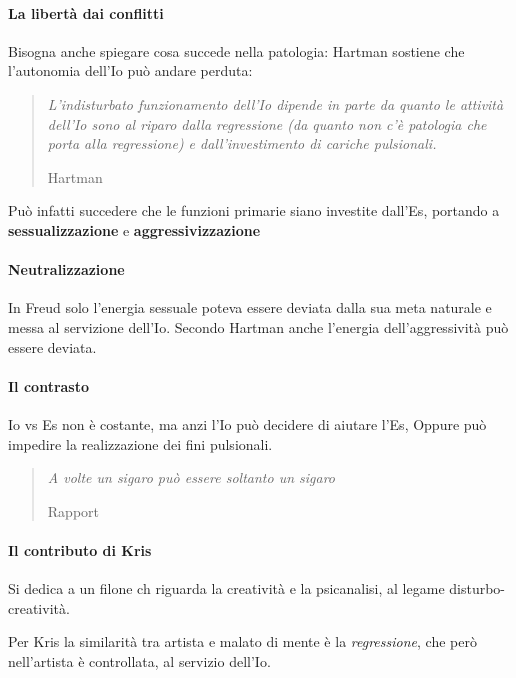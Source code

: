 \documentclass[12pt, a4paper]{article}
\begin{document}
\paragraph{La libert\`a dai conflitti} Bisogna anche spiegare cosa succede nella patologia: Hartman sostiene che l'autonomia dell'Io può andare perduta:

\begin{quote}
    \emph{L'indisturbato funzionamento dell'Io dipende in parte da quanto le attivit\`a dell'Io sono al riparo dalla regressione (da quanto non c'\`e patologia che porta alla regressione) e dall'investimento di cariche pulsionali.}
    \begin{flushright}
        Hartman
    \end{flushright}
\end{quote}

Può infatti succedere che le funzioni primarie siano investite dall'Es, portando a \textbf{sessualizzazione} e \textbf{aggressivizzazione}

\paragraph{Neutralizzazione} In Freud solo l'energia sessuale poteva essere deviata dalla sua meta naturale e messa al servizione dell'Io. Secondo Hartman anche l'energia dell'aggressivit\`a può essere deviata.

\paragraph{Il contrasto} Io vs Es non \`e costante, ma anzi l'Io può decidere di aiutare l'Es, Oppure può impedire la realizzazione dei fini pulsionali.

\begin{quote}
    \emph{A volte un sigaro può essere soltanto un sigaro}
    \begin{flushright}
        Rapport
    \end{flushright}
\end{quote}


\paragraph{Il contributo di Kris} Si dedica a un filone ch riguarda la creativit\`a e la psicanalisi, al legame disturbo-creativit\`a.

Per Kris la similarit\`a tra artista e malato di mente \`e la \emph{regressione}, che però nell'artista \`e controllata, al servizio dell'Io.
\end{document}
